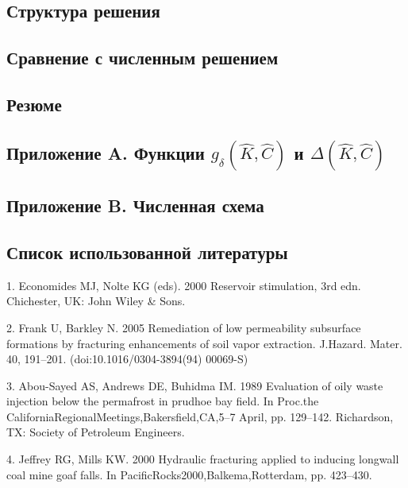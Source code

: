 \documentclass[main.tex]{subfiles}
\begin{document}
\subsection{Структура решения}

\subsection{Сравнение с численным решением}

\subsection{Резюме}

\subsection*{Приложение A. Функции $g_{\delta}\!\left(\hat{K},\hat{C}\right)$ и $\Delta\!\left(\hat{K},\hat{C}\right)$}


\subsection*{Приложение B. Численная схема}


\subsection*{Список использованной литературы}

1. Economides MJ, Nolte KG (eds). 2000 Reservoir stimulation, 3rd edn. Chichester, UK: John Wiley \& Sons.

2. Frank U, Barkley N. 2005 Remediation of low permeability subsurface formations by fracturing enhancements of soil vapor extraction. J.Hazard. Mater. 40, 191–201. (doi:10.1016/0304-3894(94) 00069-S)

3. Abou-Sayed AS, Andrews DE, Buhidma IM. 1989 Evaluation of oily waste injection below the permafrost in prudhoe bay field. In Proc.the CaliforniaRegionalMeetings,Bakersfield,CA,5–7 April, pp. 129–142. Richardson, TX: Society of Petroleum Engineers.

4. Jeffrey RG, Mills KW. 2000 Hydraulic fracturing applied to inducing longwall coal mine goaf falls. In PacificRocks2000,Balkema,Rotterdam, pp. 423–430.
\end{document}
